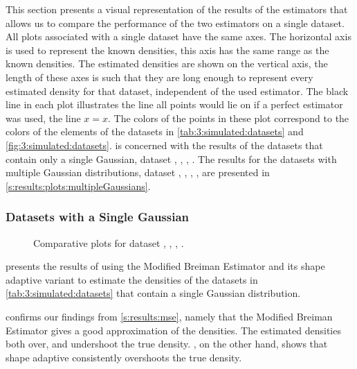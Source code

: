 This section presents a visual representation of the results of the estimators that allows us to compare the performance of the two estimators on a single dataset. All plots associated with a single dataset have the same axes. The horizontal axis is used to represent the known densities, this axis has the same range as the known densities. The estimated densities are shown on the vertical axis, the length of these axes is such that they are long enough to represent every estimated density for that dataset, independent of the used estimator. The black line in each plot illustrates the line all points would lie on if a perfect estimator was used, \ie the line $x = x$. The colors of the points in these plot correspond to the colors of the elements of the datasets in \cref{tab:3:simulated:datasets} and \cref{fig:3:simulated:datasets}.  is concerned with the results of the datasets that contain only a single Gaussian, \ie dataset \ferdosiOne, \baakmanOne, \baakmanFour, \baakmanFive. The results for the datasets with multiple Gaussian distributions, \ie dataset \ferdosiTwo, \baakmanTwo, \ferdosiThree, \baakmanThree, are presented in \cref{s:results:plots:multipleGaussians}.

\subsubsection{Datasets with a Single Gaussian}
	\label{s:results:plots:singleGaussian}

	\begin{figure}
		\centering
		
		\caption{Comparative plots for dataset \ferdosiOne, \baakmanOne, \baakmanFour, \baakmanFive.}
		\label{fig:4:results:singleSphere}
	\end{figure}

		 presents the results of using the Modified Breiman Estimator and its shape adaptive variant to estimate the densities of the datasets in \cref{tab:3:simulated:datasets} that contain a single Gaussian distribution. 

		 confirms our findings from \cref{s:results:mse}, namely that the Modified Breiman Estimator gives a good approximation of the densities. The estimated densities both over, and undershoot the true density. , on the other hand, shows that shape adaptive \mbe consistently overshoots the true density. 

